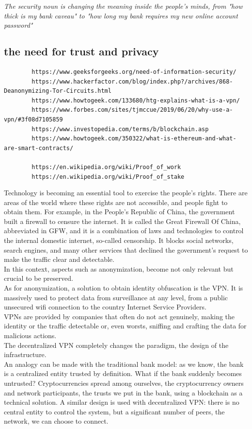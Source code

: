 \documentclass[12pt]{article}
\begin{document}
	\textit{The security noun is changing the meaning inside the people's minds, from "how thick is my bank caveau" to "how long my bank requires my new online account password"}

	\subsection{the need for trust and privacy}

	\begin{verbatim}
		https://www.geeksforgeeks.org/need-of-information-security/
		https://www.hackerfactor.com/blog/index.php?/archives/868-Deanonymizing-Tor-Circuits.html
		https://www.howtogeek.com/133680/htg-explains-what-is-a-vpn/
		https://www.forbes.com/sites/tjmccue/2019/06/20/why-use-a-vpn/#3f08d7105859
		https://www.investopedia.com/terms/b/blockchain.asp
		https://www.howtogeek.com/350322/what-is-ethereum-and-what-are-smart-contracts/
		
		https://en.wikipedia.org/wiki/Proof_of_work
		https://en.wikipedia.org/wiki/Proof_of_stake
	\end{verbatim}

	Technology is becoming an essential tool to exercise the people's rights. There are areas of the world where these rights are not accessible, and people fight to obtain them. For example, in the People's Republic of China, the government built a firewall to censure the internet. It is called the Great Firewall Of China, abbreviated in GFW, and it is a combination of laws and technologies to control the internal domestic internet, so-called censorship. It blocks social networks, search engines, and many other services that declined the government's request to make the traffic clear and detectable.\\
	In this context, aspects such as anonymization, become not only relevant but crucial to be preserved.\\
	As for anonymization, a solution to obtain identity obfuscation is the VPN. It is massively used to protect data from surveillance at any level, from a public unsecured wifi connection to the country Internet Service Providers.\\VPNs are provided by companies that often do not act genuinely, making the identity or the traffic detectable or, even worsts, sniffing and crafting the data for malicious actions.\\

	The decentralized VPN completely changes the paradigm, the design of the infrastructure.\\
	An analogy can be made with the traditional bank model: as we know, the bank is a centralized entity trusted by definition. What if the bank suddenly becomes untrusted? Cryptocurrencies spread among ourselves, the cryptocurrency owners and network participants, the trusts we put in the bank, using a blockchain as a technical solution. 
	A similar design is used with decentralized VPN: there is no central entity to control the system, but a significant number of peers, the network, we can choose to connect.
\end{document}
